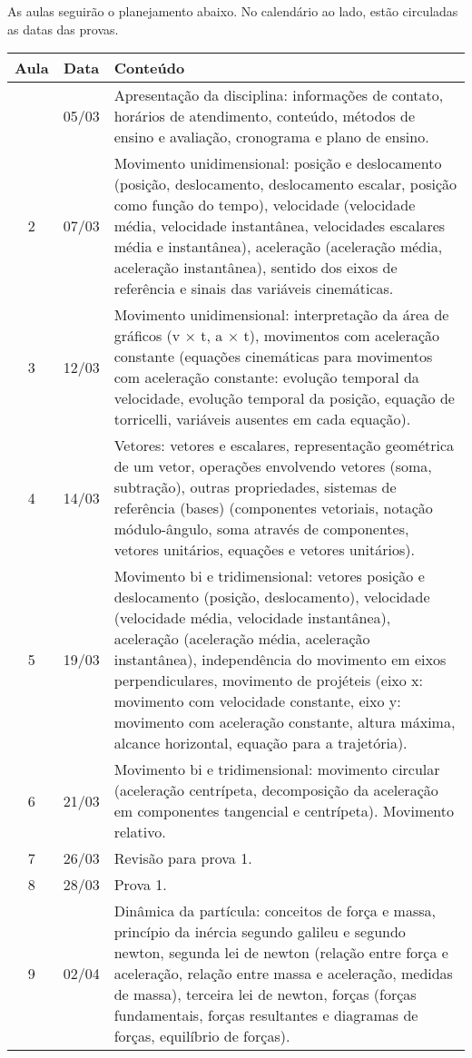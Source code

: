 As aulas seguirão o planejamento abaixo. No calendário ao lado, estão circuladas as datas das provas.
\begin{center}
\begin{longtable}{ccp{70mm}}
\toprule
Aula & Data & Conteúdo \\
\midrule
\endhead
\bottomrule
\endfoot
1 & 05/03 & Apresentação da disciplina: informações de contato, horários de atendimento, conteúdo, métodos de ensino e avaliação, cronograma e plano de ensino. \\
2 & 07/03 & Movimento unidimensional: posição e deslocamento (posição, deslocamento, deslocamento escalar, posição como função do tempo), velocidade (velocidade média, velocidade instantânea, velocidades escalares média e instantânea), aceleração (aceleração média, aceleração instantânea), sentido dos eixos de referência e sinais das variáveis cinemáticas. \\
3 & 12/03 & Movimento unidimensional: interpretação da área de gráficos (v × t, a × t), movimentos com aceleração constante (equações cinemáticas para movimentos com aceleração constante: evolução temporal da velocidade, evolução temporal da posição, equação de torricelli, variáveis ausentes em cada equação). \\
4 & 14/03 & Vetores: vetores e escalares, representação geométrica de um vetor, operações envolvendo vetores (soma, subtração), outras propriedades, sistemas de referência (bases) (componentes vetoriais, notação módulo-ângulo, soma através de componentes, vetores unitários, equações e vetores unitários). \\
5 & 19/03 & Movimento bi e tridimensional: vetores posição e deslocamento (posição, deslocamento), velocidade (velocidade média, velocidade instantânea), aceleração (aceleração média, aceleração instantânea), independência do movimento em eixos perpendiculares, movimento de projéteis (eixo x: movimento com velocidade constante, eixo y: movimento com aceleração constante, altura máxima, alcance horizontal, equação para a trajetória). \\
6 & 21/03 & Movimento bi e tridimensional: movimento circular (aceleração centrípeta, decomposição da aceleração em componentes tangencial e centrípeta). Movimento relativo. \\
7 & 26/03 & Revisão para prova 1. \\
8 & 28/03 & Prova 1. \\
9 & 02/04 & Dinâmica da partícula: conceitos de força e massa, princípio da inércia segundo galileu e segundo newton, segunda lei de newton (relação entre força e aceleração, relação entre massa e aceleração, medidas de massa), terceira lei de newton, forças (forças fundamentais, forças resultantes e diagramas de forças, equilíbrio de forças). \\

\end{longtable}
\end{center}
